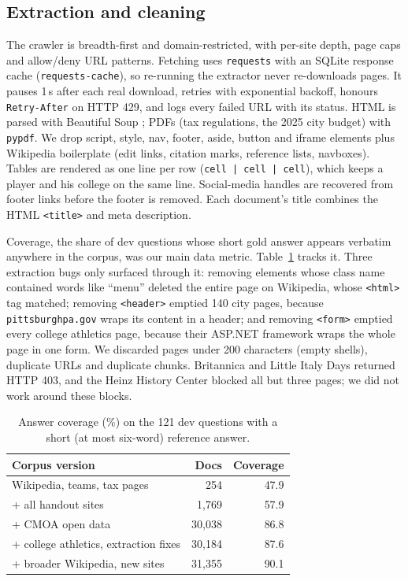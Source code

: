 \documentclass[11pt]{article}
\begin{document}
\subsection{Extraction and cleaning}

The crawler is breadth-first and domain-restricted, with per-site depth, page caps and allow/deny URL patterns. Fetching uses \texttt{requests} with an SQLite response cache (\texttt{requests-cache}), so re-running the extractor never re-downloads pages. It pauses 1\,s after each real download, retries with exponential backoff, honours \texttt{Retry-After} on HTTP 429, and logs every failed URL with its status. HTML is parsed with Beautiful Soup \citep{richardson2007bs4}; PDFs (tax regulations, the 2025 city budget) with \texttt{pypdf}. We drop script, style, nav, footer, aside, button and iframe elements plus Wikipedia boilerplate (edit links, citation marks, reference lists, navboxes). Tables are rendered as one line per row (\texttt{cell | cell | cell}), which keeps a player and his college on the same line. Social-media handles are recovered from footer links before the footer is removed. Each document's title combines the HTML \texttt{<title>} and meta description.

Coverage, the share of dev questions whose short gold answer appears verbatim anywhere in the corpus, was our main data metric. Table~\ref{tab:coverage} tracks it. Three extraction bugs only surfaced through it:
removing elements whose class name contained words like ``menu'' deleted the entire page on Wikipedia, whose \texttt{<html>} tag matched;
removing \texttt{<header>} emptied 140 city pages, because \texttt{pittsburghpa.gov} wraps its content in a header;
and removing \texttt{<form>} emptied every college athletics page, because their ASP.NET framework wraps the whole page in one form.
We discarded pages under 200 characters (empty shells), duplicate URLs and duplicate chunks.
Britannica and Little Italy Days returned HTTP 403, and the Heinz History Center blocked all but three pages; we did not work around these blocks.

\begin{table}[t]
  \centering
  \small
  \begin{tabular}{lrr}
    \toprule
    Corpus version & Docs & Coverage \\
    \midrule
    Wikipedia, teams, tax pages & 254 & 47.9 \\
    + all handout sites & 1{,}769 & 57.9 \\
    + CMOA open data & 30{,}038 & 86.8 \\
    + college athletics, extraction fixes & 30{,}184 & 87.6 \\
    + broader Wikipedia, new sites & 31{,}355 & 90.1 \\
    \bottomrule
  \end{tabular}
  \caption{Answer coverage (\%) on the 121 dev questions with a short (at most six-word) reference answer.}
  \label{tab:coverage}
\end{table}
\end{document}
